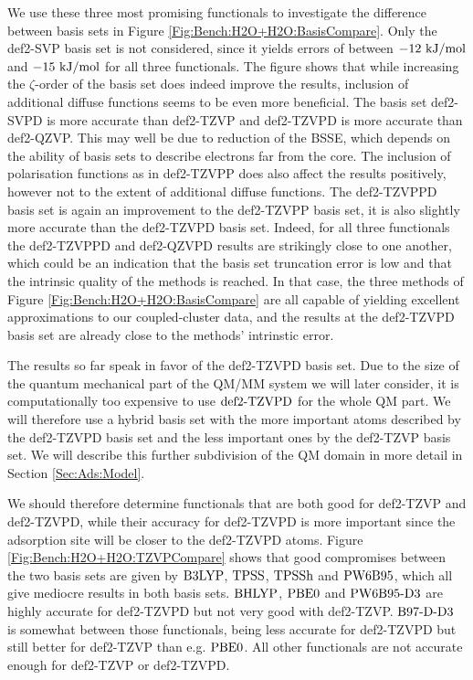 \documentclass[8.5pt,twoside,twocolumn]{article}
\newcommand\kmo{\enmat{\te {kJ/mol}}}
\theoremstyle{standard}
\begin{document}
We use these three most promising functionals to investigate the difference
between basis sets in Figure \ref{Fig:Bench:H2O+H2O:BasisCompare}. Only the def2-SVP basis set is not
considered, since it yields errors of between $-12\ \kmo$ and $-15\ \kmo$ for all three
functionals. The figure shows that while increasing the $\zeta$-order of the basis set
does indeed improve the results, inclusion of additional diffuse functions seems to
be even more beneficial. The basis set def2-SVPD is more accurate than def2-TZVP and
def2-TZVPD is more accurate than def2-QZVP.
This may well be due to reduction of the BSSE, which depends on the ability
of basis sets to describe electrons far from the core.
The inclusion of polarisation functions as in def2-TZVPP does
also affect the results positively, however not to the extent of additional
diffuse functions. The def2-TZVPPD basis set is again an improvement
to the def2-TZVPP basis set, it is also slightly more accurate than the
def2-TZVPD basis set. Indeed, for all three functionals the def2-TZVPPD and
def2-QZVPD results are strikingly close to one another, which could
be an indication that the basis set truncation error is low and that
the intrinsic quality of the methods is reached. In that case, the
three methods of Figure \ref{Fig:Bench:H2O+H2O:BasisCompare} are all
capable of yielding excellent approximations to our coupled-cluster data,
and the results at the def2-TZVPD basis set are already close to the
methods' intrinstic error.  

The results so far speak in favor of the def2-TZVPD basis set. Due 
to the size of the quantum mechanical part of the QM/MM system we will later consider,
it is computationally too expensive to use $\text{def2-TZVPD}$ for the whole
QM part. We will therefore use a hybrid basis set with the more important atoms
described by the def2-TZVPD basis set and the less important ones by the
def2-TZVP basis set. We will describe this further subdivision of the QM domain
in more detail in Section \ref{Sec:Ads:Model}.

We should therefore determine functionals that are both good for def2-TZVP and def2-TZVPD,
while their accuracy for def2-TZVPD is more important since the adsorption site will
be closer to the def2-TZVPD atoms. Figure \ref{Fig:Bench:H2O+H2O:TZVPCompare} shows
that good compromises between the two basis sets
are given by $\text{B3LYP}$, $\text{TPSS}$, $\text{TPSSh}$ and $\text{PW6B95}$, which all give mediocre results in
both basis sets. $\text{BHLYP}$, $\text{PBE0}$ and $\text{PW6B95}\text{-D3}$ are highly accurate for def2-TZVPD but not very good
with def2-TZVP. $\text{B97-D}\text{-D3}$ is somewhat between those functionals, being less accurate for 
def2-TZVPD but still better for def2-TZVP than e.g. $\text{PBE0}$. All other
functionals are not accurate enough for def2-TZVP or def2-TZVPD.
\end{document}
